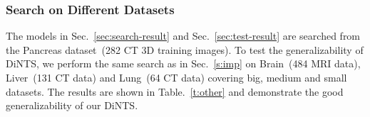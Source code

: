 \documentclass[final]{cvpr}
\begin{document}
\subsubsection{Search on Different Datasets}
The models in Sec.~\ref{sec:search-result} and Sec.~\ref{sec:test-result} are searched from the Pancreas dataset~(282 CT 3D training images). To test the generalizability of DiNTS, we perform the same search as in Sec.~\ref{s:imp} on Brain~(484 MRI data), Liver~(131 CT data) and Lung~(64 CT data) covering big, medium and small datasets. The results are shown in Table.~\ref{t:other} and demonstrate the good generalizability of our DiNTS. 
\begin{table}[]
\caption{Dice-Sørensen score~(DSC) of 5-fold cross validation on Brain, Liver and Lung datasets of architectures searched from Pancreas, Brain, Liver and Lung datasets with .}
\label{t:other}
\end{table}
\end{document}
